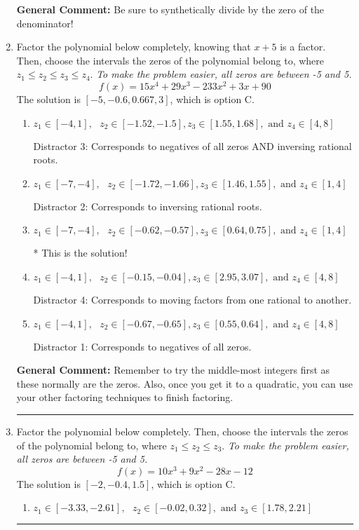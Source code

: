 \documentclass{extbook}[14pt]
\newcommand{\litem}[1]{\item #1

\rule{\textwidth}{0.4pt}}
\begin{document}
\begin{enumerate}
{\textbf{General Comment:} Be sure to synthetically divide by the zero of the denominator!
}
\litem{
Factor the polynomial below completely, knowing that $x + 5$ is a factor. Then, choose the intervals the zeros of the polynomial belong to, where $z_1 \leq z_2 \leq z_3 \leq z_4$. \textit{To make the problem easier, all zeros are between -5 and 5.}
\[ f(x) = 15x^{4} +29 x^{3} -233 x^{2} +3 x + 90 \]The solution is \( [-5, -0.6, 0.667, 3] \), which is option C.\begin{enumerate}[label=\Alph*.]
\item \( z_1 \in [-4, 1], \text{   }  z_2 \in [-1.52, -1.5], z_3 \in [1.55, 1.68], \text{   and   } z_4 \in [4, 8] \)

 Distractor 3: Corresponds to negatives of all zeros AND inversing rational roots.
\item \( z_1 \in [-7, -4], \text{   }  z_2 \in [-1.72, -1.66], z_3 \in [1.46, 1.55], \text{   and   } z_4 \in [1, 4] \)

 Distractor 2: Corresponds to inversing rational roots.
\item \( z_1 \in [-7, -4], \text{   }  z_2 \in [-0.62, -0.57], z_3 \in [0.64, 0.75], \text{   and   } z_4 \in [1, 4] \)

* This is the solution!
\item \( z_1 \in [-4, 1], \text{   }  z_2 \in [-0.15, -0.04], z_3 \in [2.95, 3.07], \text{   and   } z_4 \in [4, 8] \)

 Distractor 4: Corresponds to moving factors from one rational to another.
\item \( z_1 \in [-4, 1], \text{   }  z_2 \in [-0.67, -0.65], z_3 \in [0.55, 0.64], \text{   and   } z_4 \in [4, 8] \)

 Distractor 1: Corresponds to negatives of all zeros.
\end{enumerate}

\textbf{General Comment:} Remember to try the middle-most integers first as these normally are the zeros. Also, once you get it to a quadratic, you can use your other factoring techniques to finish factoring.
}
\litem{
Factor the polynomial below completely. Then, choose the intervals the zeros of the polynomial belong to, where $z_1 \leq z_2 \leq z_3$. \textit{To make the problem easier, all zeros are between -5 and 5.}
\[ f(x) = 10x^{3} +9 x^{2} -28 x -12 \]The solution is \( [-2, -0.4, 1.5] \), which is option C.\begin{enumerate}[label=\Alph*.]
\item \( z_1 \in [-3.33, -2.61], \text{   }  z_2 \in [-0.02, 0.32], \text{   and   } z_3 \in [1.78, 2.21] \)


\end{enumerate}}
\end{enumerate}
\end{document}
